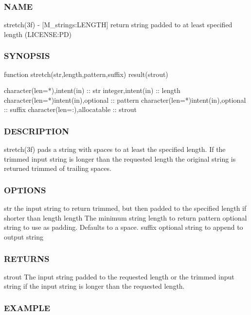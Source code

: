 \subsubsection*{N\+A\+ME}

stretch(3f) -\/ \mbox{[}M\+\_\+strings\+:L\+E\+N\+G\+TH\mbox{]} return string padded to at least specified length (L\+I\+C\+E\+N\+SE\+:PD) 

\subsubsection*{S\+Y\+N\+O\+P\+S\+IS}

\begin{DoxyVerb}function stretch(str,length,pattern,suffix) result(strout)

 character(len=*),intent(in)         :: str
 integer,intent(in)                  :: length
 character(len=*)intent(in),optional :: pattern
 character(len=*)intent(in),optional :: suffix
 character(len=:),allocatable        :: strout
\end{DoxyVerb}
 \subsubsection*{D\+E\+S\+C\+R\+I\+P\+T\+I\+ON}

stretch(3f) pads a string with spaces to at least the specified length. If the trimmed input string is longer than the requested length the original string is returned trimmed of trailing spaces. \subsubsection*{O\+P\+T\+I\+O\+NS}

str the input string to return trimmed, but then padded to the specified length if shorter than length length The minimum string length to return pattern optional string to use as padding. Defaults to a space. suffix optional string to append to output string \subsubsection*{R\+E\+T\+U\+R\+NS}

strout The input string padded to the requested length or the trimmed input string if the input string is longer than the requested length.

\subsubsection*{E\+X\+A\+M\+P\+LE}


